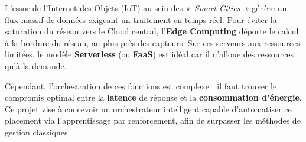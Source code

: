 
L'essor de l'Internet des Objets (IoT) au sein des \textit{«~Smart Cities~»} génère un flux massif de données exigeant un traitement en temps réel. Pour éviter la saturation du réseau vers le Cloud central, l'\textbf{Edge Computing} déporte le calcul à la bordure du réseau, au plus près des capteurs. Sur ces serveurs aux ressources limitées, le modèle \textbf{Serverless} (ou \textbf{FaaS}) est idéal car il n'alloue des ressources qu'à la demande.

Cependant, l'orchestration de ces fonctions est complexe : il faut trouver le compromis optimal entre la \textbf{latence} de réponse et la \textbf{consommation d'énergie}. Ce projet vise à concevoir un orchestrateur intelligent capable d'automatiser ce placement via l'apprentissage par renforcement, afin de surpasser les méthodes de gestion classiques.
